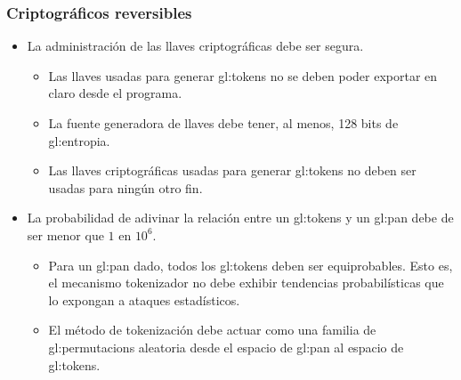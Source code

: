 %
%

\subsubsection{Criptográficos reversibles}

\begin{itemize}

  \item La administración de las llaves criptográficas debe ser segura.

  \begin{itemize}

    \item Las llaves usadas para generar \glspl{gl:token} no se deben poder
      exportar en claro desde el programa.

    \item La fuente generadora de llaves debe tener, al menos, 128 bits de
      \gls{gl:entropia}.

    \item Las llaves criptográficas usadas para generar \glspl{gl:token} no
      deben ser usadas para ningún otro fin.

  \end{itemize}

  \item La probabilidad de adivinar la relación entre un \glspl{gl:token} y un
    \gls{gl:pan} debe de ser menor que $ 1 $ en $ 10^6 $.

  \begin{itemize}

    \item Para un \gls{gl:pan} dado, todos los \glspl{gl:token} deben ser
      equiprobables. Esto es, el mecanismo tokenizador no debe exhibir
      tendencias probabilísticas que lo expongan a ataques estadísticos.

    \item El método de tokenización debe actuar como una familia de
      \glspl{gl:permutacion} aleatoria desde el espacio de \gls{gl:pan} al
      espacio de \glspl{gl:token}.


\end{itemize}
\end{itemize}

